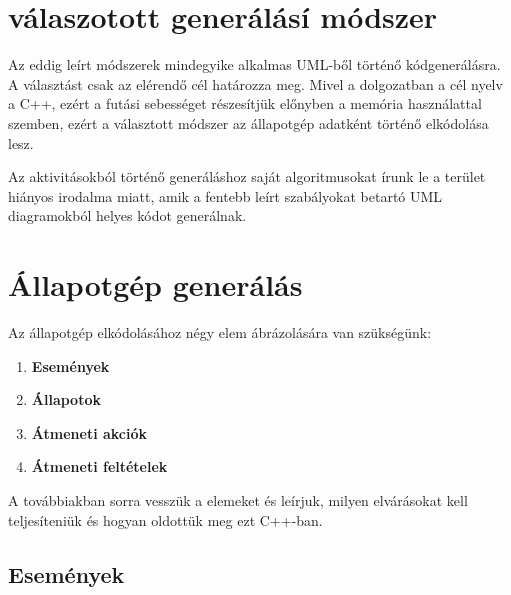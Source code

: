 \documentclass[a4paper,12pt]{report}
\begin{document}
\section{válaszotott generálásí módszer}

Az eddig leírt módszerek mindegyike alkalmas UML-ből történő kódgenerálásra. A választást csak az elérendő cél határozza meg. Mivel a dolgozatban a cél nyelv a C++, ezért a futási sebességet részesítjük előnyben a memória használattal szemben, ezért a választott módszer az állapotgép adatként történő elkódolása lesz. 

Az aktivitásokból történő generáláshoz saját algoritmusokat írunk le a terület hiányos irodalma miatt, amik a fentebb leírt szabályokat betartó UML diagramokból helyes kódot generálnak.

\section{Állapotgép generálás}

Az állapotgép elkódolásához négy elem ábrázolására van szükségünk:
\begin{enumerate}
\item {\bf Események}
\item {\bf Állapotok}
\item {\bf Átmeneti akciók}
\item {\bf Átmeneti feltételek}
\end{enumerate}
A továbbiakban sorra vesszük a elemeket és leírjuk, milyen elvárásokat kell teljesíteniük és hogyan oldottük meg ezt C++-ban.

\subsection{Események}
\end{document}
